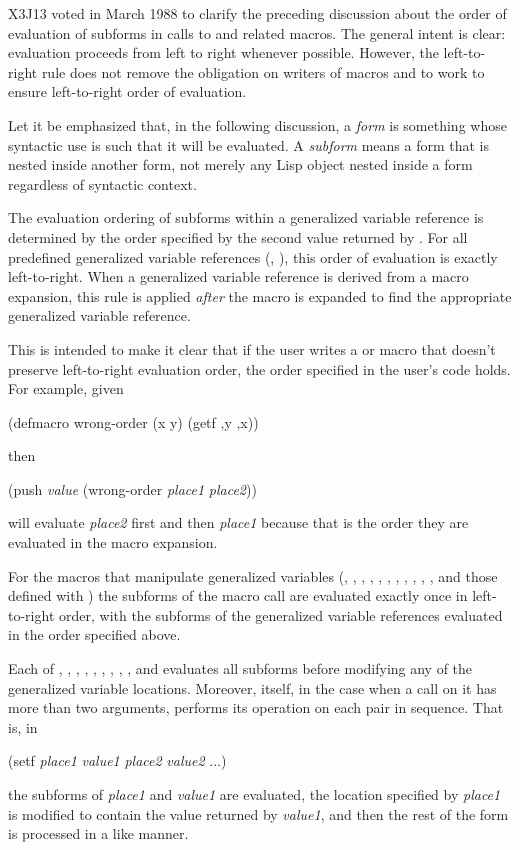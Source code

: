 \begin{newer}
X3J13 voted in March 1988 
to clarify the preceding discussion about the order of evaluation of
subforms in calls to  and related macros.
The general intent is clear: evaluation
proceeds from left to right whenever possible. However, the left-to-right rule does not
remove the obligation on writers of macros and  to work
to ensure left-to-right order of evaluation.

Let it be emphasized that, in the following discussion,
a {\it form} is something whose syntactic use is such that it will
be evaluated.  A {\it subform} means a form that is nested inside another form,
not merely any Lisp object nested inside a form regardless of syntactic context. 

The evaluation ordering of subforms within a generalized variable
reference is determined by the order specified by the second value returned by
.  For all predefined generalized variable references
(, ), this order of evaluation is exactly left-to-right.
When a generalized
variable reference is derived from a macro expansion, this rule is applied
{\it after} the macro is expanded to find the appropriate generalized variable
reference. 

This is intended to make it clear that if the user writes a  or
 macro that doesn't preserve left-to-right
evaluation order, the order specified in the
user's code holds.  For example, given
\begin{lisp}
(defmacro wrong-order (x y) {\Xbq}(getf ,y ,x))
\end{lisp}
then
\begin{lisp}
(push {\it value} (wrong-order {\it place1} {\it place2}))
\end{lisp}
will evaluate {\it place2} first and then {\it place1} because that is the order they
are evaluated in the macro expansion.
 
For the macros that manipulate generalized variables (, , ,
, , , , ,
, , , and those defined with
) the subforms of the macro call are evaluated exactly once
in left-to-right order, with the subforms of the generalized variable
references evaluated in the order specified above.

Each of
, , , , , ,
, , , and  evaluates
all subforms before modifying any of the generalized variable locations.  Moreover,
 itself,
in the case when a call on it has more than two arguments, performs its
operation on each pair in sequence.  That is, in
\begin{lisp}
(setf {\it place1} {\it value1} {\it place2} {\it value2} ...)
\end{lisp}
the subforms of {\it place1} and {\it value1} are evaluated, the
location specified by {\it place1} is modified to contain the value returned by
{\it value1}, and then the rest of the  form is processed in a like manner.


\end{newer}
